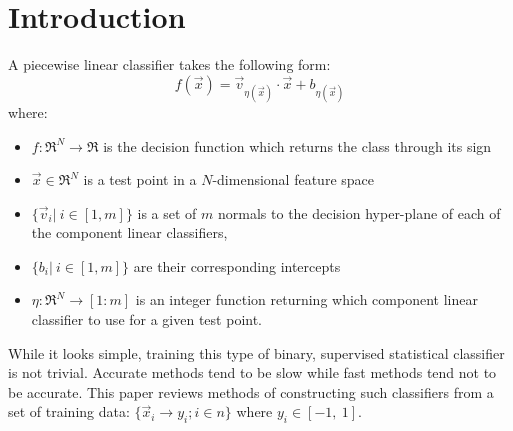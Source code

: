 \documentclass{article}
\newcommand{\decision}{f}
\newcommand{\testpoint}{\vec x}
\newcommand{\domainfunction}{\eta}
\newcommand{\normal}{v}
\newcommand{\constant}{b}
\newcommand{\dimension}{N}
\newcommand{\ndomain}{m}
\newcommand{\sample}{x}
\newcommand{\ord}{y}
\newcommand{\ntrain}{n}
\begin{document}
\section{Introduction}

A piecewise linear classifier takes the following form:
\begin{equation}
\decision(\testpoint) = \vec \normal_{\domainfunction(\testpoint)} \cdot \testpoint + \constant_{\domainfunction(\testpoint)}
\end{equation}
where:
\begin{itemize}
  \item $\decision:\Re^\dimension \rightarrow \Re$ is the decision function which returns the class through its sign
  \item $\testpoint \in \Re^\dimension$ is a test point in a 
	  $\dimension$-dimensional feature space
  \item $\lbrace \vec \normal_i|~ i \in [1,\ndomain] \rbrace$ is a set of $\ndomain$
	  normals to the decision hyper-plane of each of the 
	  component linear classifiers,
  \item $\lbrace \constant_i|~ i \in [1,\ndomain] \rbrace$ are their corresponding intercepts
  \item $\domainfunction:\Re^\dimension \rightarrow [1:\ndomain]$ is an integer
function returning which component linear classifier to use for a given
test point.
\end{itemize}

While it looks simple, training this type of binary, 
supervised statistical classifier is not trivial.
Accurate methods tend to be slow while fast methods tend not to be accurate.
This paper reviews methods of constructing such classifiers from a set of 
training data: $\lbrace \vec \sample_i \rightarrow \ord_i; i \in \ntrain \rbrace$
where $\ord_i \in [-1,~ 1]$.
\end{document}
